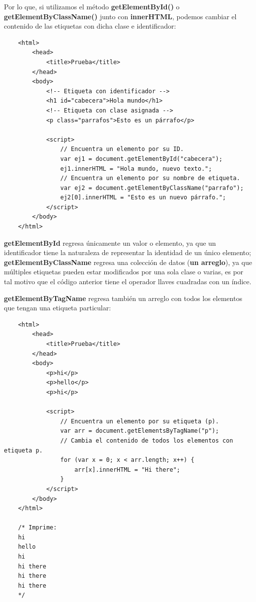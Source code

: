 Por lo que, si utilizamos el método \textbf{getElementById()} o \textbf{getElementByClassName()} junto con \textbf{innerHTML}, podemos cambiar el contenido de las etiquetas con dicha clase e identificador:
\begin{lstlisting}
    <html>
        <head>
            <title>Prueba</title>
        </head>
        <body>
            <!-- Etiqueta con identificador -->
            <h1 id="cabecera">Hola mundo</h1>
            <!-- Etiqueta con clase asignada -->
            <p class="parrafos">Esto es un párrafo</p>
            
            <script>
                // Encuentra un elemento por su ID.
                var ej1 = document.getElementById("cabecera");
                ej1.innerHTML = "Hola mundo, nuevo texto.";
                // Encuentra un elemento por su nombre de etiqueta.
                var ej2 = document.getElementByClassName("parrafo");
                ej2[0].innerHTML = "Esto es un nuevo párrafo.";
            </script>
        </body>
    </html>
\end{lstlisting}

\textbf{getElementById} regresa únicamente un valor o elemento, ya que un identificador tiene la naturaleza de representar la identidad de un único elemento; \textbf{getElementByClassName} regresa una colección de datos (\textbf{un arreglo}), ya que múltiples etiquetas pueden estar modificados por una sola clase o varias, es por tal motivo que el código anterior tiene el operador llaves cuadradas con un índice.

\textbf{getElementByTagName} regresa también un arreglo con todos los elementos que tengan una etiqueta particular:
\begin{lstlisting}
    <html>
        <head>
            <title>Prueba</title>
        </head>
        <body>
            <p>hi</p>
            <p>hello</p>
            <p>hi</p>
            
            <script>
                // Encuentra un elemento por su etiqueta (p).
                var arr = document.getElementsByTagName("p");
                // Cambia el contenido de todos los elementos con etiqueta p.
                for (var x = 0; x < arr.length; x++) {
                    arr[x].innerHTML = "Hi there";
                }
            </script>
        </body>
    </html>

    /* Imprime:
    hi
    hello
    hi
    hi there
    hi there
    hi there
    */
\end{lstlisting}

